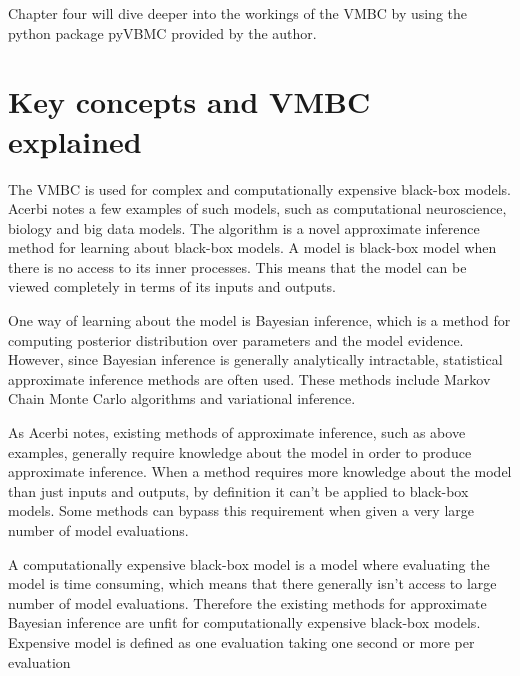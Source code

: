 \documentclass[english,oneside,openany]{UH_DS_report}
\begin{document}
Chapter four will dive deeper into the workings of the VMBC
by using the python package pyVBMC provided by the author. 


\chapter{Key concepts and VMBC explained}
\label{chapter:structure}


The VMBC is used for complex and computationally expensive black-box models. 
Acerbi notes a few examples of such models, such as computational neuroscience, biology and 
big data models\cite{acerbi2018}\cite{acerbi2020}.
The algorithm is a novel approximate inference  method for learning about black-box models. A model is black-box model when there is no access to its inner processes. This means that the 
model can be viewed completely in terms of its inputs and outputs. 

One way of learning about the model is Bayesian inference, which is a method for computing posterior distribution
over parameters and the model evidence. However, since Bayesian inference is 
generally analytically intractable\cite{acerbi2018}, statistical approximate inference methods 
are often used. These methods include Markov Chain Monte Carlo algorithms and variational inference.

As Acerbi notes, existing methods of approximate inference, 
such as above examples, generally require knowledge about the 
model in order to produce approximate inference\cite{acerbi2018}. When a method requires more knowledge about the model
than just inputs and outputs, by definition it can't be applied to black-box models. Some methods
can bypass this requirement when given a very large number of model evaluations.

A computationally expensive black-box model is a model where evaluating the model is time consuming, 
which means that there generally isn't access to large number of model evaluations. Therefore the existing methods for approximate Bayesian inference are unfit for 
computationally expensive black-box models. Expensive model is defined as one evaluation taking 
one second or more per evaluation\cite{pyvmbc}
\end{document}
